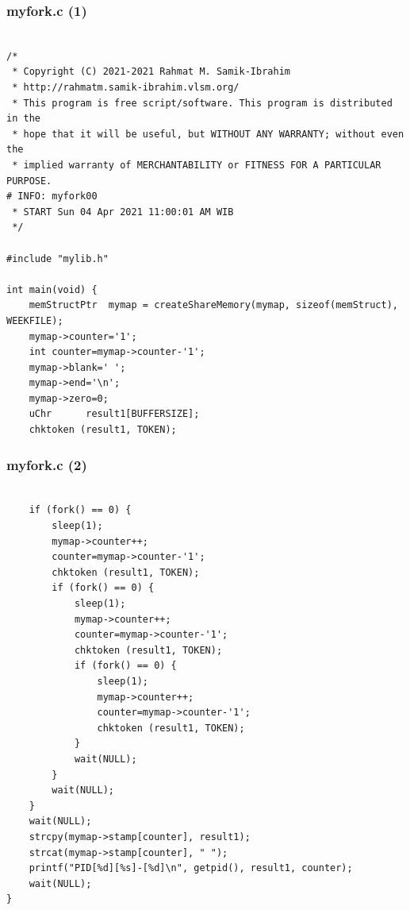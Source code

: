 \documentclass[xcolor=table, notheorems, hyperref={pdfpagelabels=false}]{beamer}
\begin{document}
\begin{frame}[fragile]
\frametitle{myfork.c (1)}
\begin{lstlisting}[basicstyle=\ttfamily\tiny]         % 108

/*
 * Copyright (C) 2021-2021 Rahmat M. Samik-Ibrahim
 * http://rahmatm.samik-ibrahim.vlsm.org/
 * This program is free script/software. This program is distributed in the 
 * hope that it will be useful, but WITHOUT ANY WARRANTY; without even the 
 * implied warranty of MERCHANTABILITY or FITNESS FOR A PARTICULAR PURPOSE.
# INFO: myfork00
 * START Sun 04 Apr 2021 11:00:01 AM WIB
 */

#include "mylib.h"

int main(void) {
    memStructPtr  mymap = createShareMemory(mymap, sizeof(memStruct), WEEKFILE);
    mymap->counter='1';
    int counter=mymap->counter-'1';
    mymap->blank=' ';
    mymap->end='\n';
    mymap->zero=0;
    uChr      result1[BUFFERSIZE];
    chktoken (result1, TOKEN);

\end{lstlisting}
\end{frame}

\begin{frame}[fragile]
\frametitle{myfork.c (2)}
\begin{lstlisting}[basicstyle=\ttfamily\tiny]         % 108

    if (fork() == 0) {
        sleep(1);
        mymap->counter++;
        counter=mymap->counter-'1';
        chktoken (result1, TOKEN);
        if (fork() == 0) {
            sleep(1);
            mymap->counter++;
            counter=mymap->counter-'1';
            chktoken (result1, TOKEN);
            if (fork() == 0) {
                sleep(1);
                mymap->counter++;
                counter=mymap->counter-'1';
                chktoken (result1, TOKEN);
            }
            wait(NULL);
        }
        wait(NULL);
    }
    wait(NULL);
    strcpy(mymap->stamp[counter], result1);
    strcat(mymap->stamp[counter], " ");
    printf("PID[%d][%s]-[%d]\n", getpid(), result1, counter);
    wait(NULL);
}

\end{lstlisting}
\end{frame}
\end{document}
